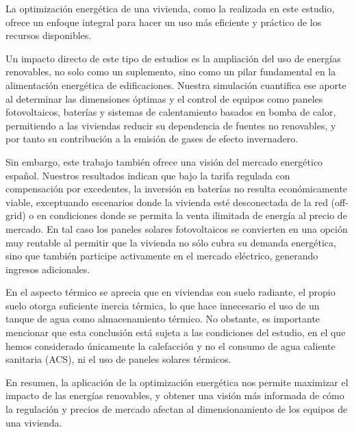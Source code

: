 La optimización energética de una vivienda, como la realizada en este estudio,
ofrece un enfoque integral para hacer un uso más eficiente y práctico de los
recursos disponibles.

Un impacto directo de este tipo de estudios es la ampliación del uso de
energías renovables, no solo como un suplemento, sino como un pilar fundamental
en la alimentación energética de edificaciones. Nuestra simulación cuantifica
ese aporte al determinar las dimensiones óptimas y el control de equipos como
paneles fotovoltaicos, baterías y sistemas de calentamiento basados en bomba de
calor, permitiendo a las viviendas reducir su dependencia de fuentes no
renovables, y por tanto su contribución a la emisión de gases de efecto
invernadero.

Sin embargo, este trabajo también ofrece una visión del mercado energético
español. Nuestros resultados indican que bajo la tarifa regulada con
compensación por excedentes, la inversión en baterías no resulta económicamente
viable, exceptuando escenarios donde la vivienda esté desconectada de la red
(off-grid) o en condiciones donde se permita la venta ilimitada de energía al
precio de mercado. En tal caso los paneles solares fotovoltaicos se convierten
en una opción muy rentable al permitir que la vivienda no sólo cubra su demanda
energética, sino que también participe activamente en el mercado eléctrico,
generando ingresos adicionales.

En el aspecto térmico se aprecia que en viviendas con suelo radiante, el propio
suelo otorga suficiente inercia térmica, lo que hace innecesario el uso de un
tanque de agua como almacenamiento térmico. No obstante, es importante
mencionar que esta conclusión está sujeta a las condiciones del estudio, en el
que hemos considerado únicamente la calefacción y no el consumo de agua
caliente sanitaria (ACS), ni el uso de paneles solares térmicos.

En resumen, la aplicación de la optimización energética nos permite maximizar
el impacto de las energías renovables, y obtener una visión más informada de
cómo la regulación y precios de mercado afectan al dimensionamiento de los
equipos de una vivienda.
